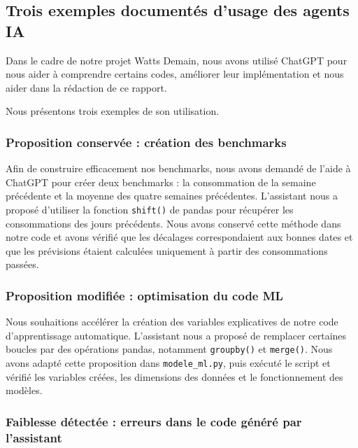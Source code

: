 \subsection{Trois exemples documentés d’usage des agents IA}
\noindent

Dans le cadre de notre projet Watts Demain, nous avons utilisé ChatGPT pour nous aider à comprendre certains codes, améliorer leur implémentation et nous aider dans la rédaction de ce rapport.

Nous présentons trois exemples de son utilisation.

\subsubsection{Proposition conservée : création des benchmarks}

Afin de construire efficacement nos benchmarks, nous avons demandé de l'aide à ChatGPT pour créer deux benchmarks : la consommation de la semaine précédente et la moyenne des quatre semaines précédentes. L'assistant nous a proposé d'utiliser la fonction \texttt{shift()} de pandas pour récupérer les consommations des jours précédents. Nous avons conservé cette méthode dans notre code et avons vérifié que les décalages correspondaient aux bonnes dates et que les prévisions étaient calculées uniquement à partir des consommations passées.

\subsubsection{Proposition modifiée : optimisation du code ML}

Nous souhaitions accélérer la création des variables explicatives de notre code d’apprentissage automatique. L’assistant nous a proposé de remplacer certaines boucles par des opérations pandas, notamment \texttt{groupby()} et \texttt{merge()}. Nous avons adapté cette proposition dans \texttt{modele\_ml.py}, puis exécuté le script et vérifié les variables créées, les dimensions des données et le fonctionnement des modèles.

\subsubsection{Faiblesse détectée : erreurs dans le code généré par l'assistant}

